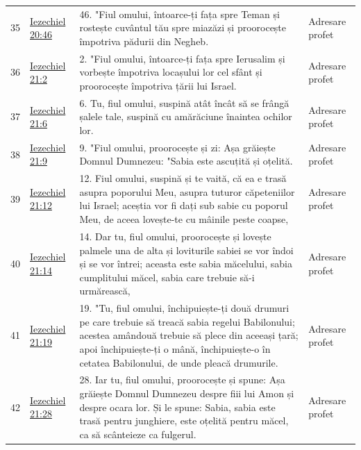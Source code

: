 \documentclass[12pt,a4paper,twoside,openany]{book}
\begin{document}
\begin{longtable}{L{0.8cm}L{1.2cm}L{11.9cm}L{0.8cm}}
35 & \href{https://bibliaortodoxa.ro/carte.php?id=33\&cap=20\#46}{Iezechiel 20:46} & 46. "Fiul omului, întoarce-ți fața spre Teman și rostește cuvântul tău spre miazăzi și proorocește împotriva pădurii din Negheb. & Adresare profet \\
36 & \href{https://bibliaortodoxa.ro/carte.php?id=33\&cap=21\#2}{Iezechiel 21:2} & 2. "Fiul omului, întoarce-ți fața spre Ierusalim și vorbește împotriva locașului lor cel sfânt și proorocește împotriva țării lui Israel. & Adresare profet \\
37 & \href{https://bibliaortodoxa.ro/carte.php?id=33\&cap=21\#6}{Iezechiel 21:6} & 6. Tu, fiul omului, suspină atât încât să se frângă șalele tale, suspină cu amărăciune înaintea ochilor lor. & Adresare profet \\
38 & \href{https://bibliaortodoxa.ro/carte.php?id=33\&cap=21\#9}{Iezechiel 21:9} & 9. "Fiul omului, proorocește și zi: Așa grăiește Domnul Dumnezeu: "Sabia este ascuțită și oțelită. & Adresare profet \\
39 & \href{https://bibliaortodoxa.ro/carte.php?id=33\&cap=21\#12}{Iezechiel 21:12} & 12. Fiul omului, suspină și te vaită, că ea e trasă asupra poporului Meu, asupra tuturor căpeteniilor lui Israel; aceștia vor fi dați sub sabie cu poporul Meu, de aceea lovește-te cu mâinile peste coapse, & Adresare profet \\
40 & \href{https://bibliaortodoxa.ro/carte.php?id=33\&cap=21\#14}{Iezechiel 21:14} & 14. Dar tu, fiul omului, proorocește și lovește palmele una de alta și loviturile sabiei se vor îndoi și se vor întrei; aceasta este sabia măcelului, sabia cumplitului măcel, sabia care trebuie să-i urmărească, & Adresare profet \\
41 & \href{https://bibliaortodoxa.ro/carte.php?id=33\&cap=21\#19}{Iezechiel 21:19} & 19. "Tu, fiul omului, închipuiește-ți două drumuri pe care trebuie să treacă sabia regelui Babilonului; acestea amândouă trebuie să plece din aceeași țară; apoi închipuiește-ți o mână, închipuiește-o în cetatea Babilonului, de unde pleacă drumurile. & Adresare profet \\
42 & \href{https://bibliaortodoxa.ro/carte.php?id=33\&cap=21\#28}{Iezechiel 21:28} & 28. Iar tu, fiul omului, proorocește și spune: Așa grăiește Domnul Dumnezeu despre fiii lui Amon și despre ocara lor. Și le spune: Sabia, sabia este trasă pentru junghiere, este oțelită pentru măcel, ca să scânteieze ca fulgerul. & Adresare profet \\

\end{longtable}
\end{document}
